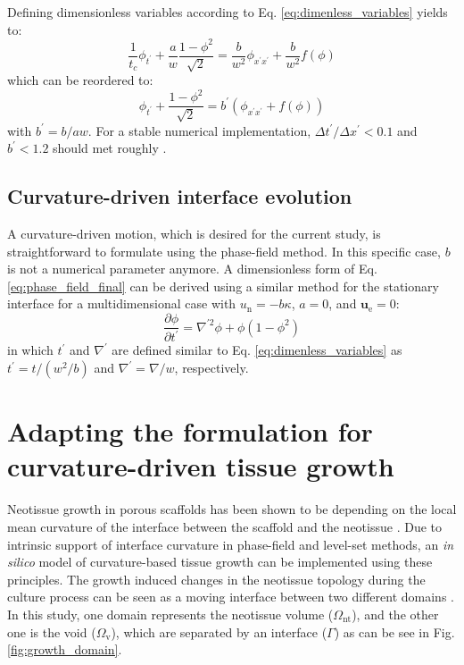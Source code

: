 Defining dimensionless variables according to Eq. \ref{eq:dimenless_variables} yields to:
\begin{equation}
\frac{1}{t_c}\phi_{t^{\prime}}+\frac{a}{w} \frac{1-\phi^{2}}{\sqrt{2}}=\frac{b}{w^2} \phi_{x^{\prime}x^{\prime}} + \frac{b}{w^{2}}f(\phi)
\end{equation}
which can be reordered to:
\begin{equation}
\phi_{t^{\prime}}+\frac{1-\phi^{2}}{\sqrt{2}}=b^{\prime}\left( \phi_{x^{\prime}x^{\prime}} + f(\phi)\right)
\end{equation}
with $b^{\prime}=b/aw$. For a stable numerical implementation, $\Delta t^{\prime}/\Delta x^{\prime} < 0.1$ and $b^{\prime} < 1.2$ should met roughly \cite{Sun2007}.


\subsection{Curvature-driven interface evolution}

A curvature-driven motion, which is desired for the current study, is straightforward to formulate using the phase-field method. In this specific case, $b$ is not a numerical parameter anymore. A dimensionless form of Eq. \ref{eq:phase_field_final} can be derived using a similar method for the stationary interface for a multidimensional case with $u_{\mathrm{n}}=-b\kappa$, $a=0$, and $\boldsymbol{u}_{\mathrm{e}}=0$:
\begin{equation} \label{eq:pf_curvature}
\frac{\partial \phi}{\partial t^{\prime}}=\nabla^{\prime 2} \phi+\phi\left(1-\phi^{2}\right)
\end{equation}
in which $t^{\prime}$ and $\nabla^{\prime}$ are defined similar to Eq. \ref{eq:dimenless_variables} as $t^{\prime}=t/(w^2/b)$ and $\nabla^{\prime}=\nabla/w$, respectively.

\section{Adapting the formulation for  curvature-driven tissue growth}

Neotissue growth in porous scaffolds has been shown to be depending on the local mean curvature of the interface between the scaffold and the neotissue \cite{Bidan2012, Bidan2012a, Rumpler2008}. Due to intrinsic support of interface curvature in phase-field and level-set methods, an \textit{in silico} model of curvature-based tissue growth can be implemented using these principles. The growth induced changes in the neotissue topology during the culture process can be seen as a moving interface between two different domains \cite{Rumpler2008}. In this study, one domain represents the neotissue volume  ($\Omega_{\text{nt}}$), and the other one is the void ($\Omega_{\text{v}}$), which are separated by an interface ($\Gamma$) as can be see in Fig. \ref{fig:growth_domain}.

